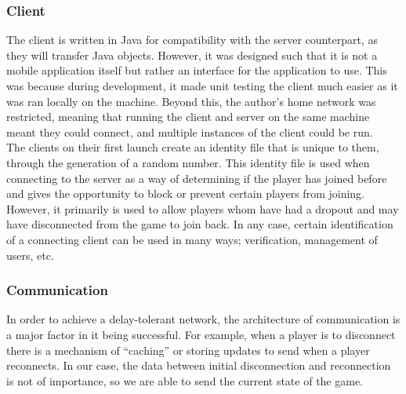 \documentclass[11pt]{article}
\begin{document}
\newpage
\subsubsection{Client}

The client is written in Java for compatibility with the server counterpart, as they will transfer Java objects. However, it was designed such that it is not a mobile application itself but rather an interface for the application to use. This was because during development, it made unit testing the client much easier as it was ran locally on the machine. Beyond this, the author's home network was restricted, meaning that running the client and server on the same machine meant they could connect, and multiple instances of the client could be run. \\

The clients on their first launch create an identity file that is unique to them, through the generation of a random number. This identity file is used when connecting to the server as a way of determining if the player has joined before and gives the opportunity to block or prevent certain players from joining. However, it primarily is used to allow players whom have had a dropout and may have disconnected from the game to join back. In any case, certain identification of a connecting client can be used in many ways; verification, management of users, etc. 



\subsubsection{Communication} %

In order to achieve a delay-tolerant network, the architecture of communication is a major factor in it being successful. For example, when a player is to disconnect there is a mechanism of “caching” or storing updates to send when a player reconnects. In our case, the data between initial disconnection and reconnection is not of importance, so we are able to send the current state of the game. \\
\end{document}
